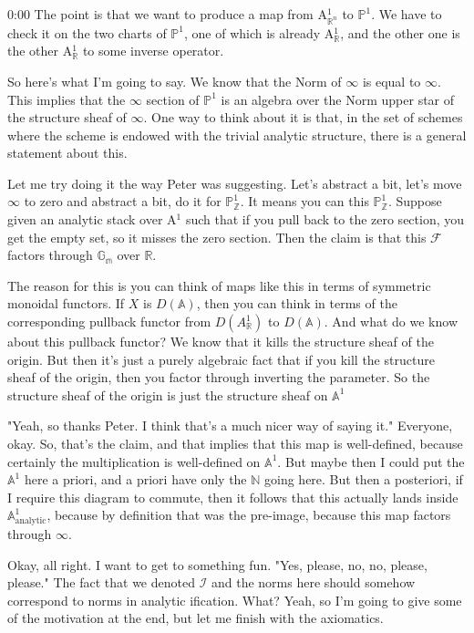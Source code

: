 \begin{unfinished}{0:00}
The point is that we want to produce a map from A$^1_{\mathbb{R}^n}$ to $\mathbb{P}^1$. We have to check it on the two charts of $\mathbb{P}^1$, one of which is already A$^1_{\mathbb{R}}$, and the other one is the other A$^1_{\mathbb{R}}$ to some inverse operator.

So here's what I'm going to say. We know that the Norm of $\infty$ is equal to $\infty$. This implies that the $\infty$ section of $\mathbb{P}^1$ is an algebra over the Norm upper star of the structure sheaf of $\infty$. One way to think about it is that, in the set of schemes where the scheme is endowed with the trivial analytic structure, there is a general statement about this.

Let me try doing it the way Peter was suggesting. Let's abstract a bit, let's move $\infty$ to zero and abstract a bit, do it for $\mathbb{P}^1_{\mathbb{Z}}$. It means you can this $\mathbb{P}^1_{\mathbb{Z}}$. Suppose given an analytic stack over A$^1$ such that if you pull back to the zero section, you get the empty set, so it misses the zero section. Then the claim is that this $\mathcal{F}$ factors through $\mathbb{G}_{\mathbb{m}}$ over $\mathbb{R}$.

The reason for this is you can think of maps like this in terms of symmetric monoidal functors. If $X$ is $D(\mathbb{A})$, then you can think in terms of the corresponding pullback functor from $D(A^1_{\mathbb{R}})$ to $D(\mathbb{A})$. And what do we know about this pullback functor? We know that it kills the structure sheaf of the origin. But then it's just a purely algebraic fact that if you kill the structure sheaf of the origin, then you factor through inverting the parameter. So the structure sheaf of the origin is just the structure sheaf on $\mathbb{A}^1$



"Yeah, so thanks Peter. I think that's a much nicer way of saying it." Everyone, okay. So, that's the claim, and that implies that this map is well-defined, because certainly the multiplication is well-defined on $\mathbb{A}^1$. But maybe then I could put the $\mathbb{A}^1$ here a priori, and a priori have only the $\mathbb{N}$ going here. But then a posteriori, if I require this diagram to commute, then it follows that this actually lands inside $\mathbb{A}^1_\text{analytic}$, because by definition that was the pre-image, because this map factors through $\infty$.

Okay, all right. I want to get to something fun. "Yes, please, no, no, please, please." The fact that we denoted $\mathcal{I}$ and the norms here should somehow correspond to norms in analytic ification. What? Yeah, so I'm going to give some of the motivation at the end, but let me finish with the axiomatics. 


\end{unfinished}
